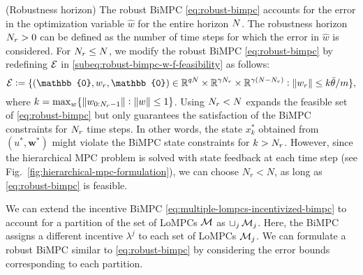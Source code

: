 \begin{remark} (Robustness horizon)
\label{rem:robustness-horizon}
The robust BiMPC \eqref{eq:robust-bimpc} accounts for the error in the optimization variable $\hat{w}$ for the entire horizon $N$.
The robustness horizon $N_r > 0$ can be defined as the number of time steps for which the error in $\hat{w}$ is considered.
For $N_r \leq N$, we modify the robust BiMPC \eqref{eq:robust-bimpc} by redefining $\mathcal{E}$ in \eqref{subeq:robust-bimpc-w-f-feasibility} as follows:
\begin{equation*}
    \mathset{E} := \{(\mathbb{0}, w_r, \mathbb{0}) \in \real^{\Nu\horizon} \times \real^{\Nw\horizon_r} \times \real^{\Nw(\horizon-\horizon_r)}: \lVert w_r \rVert \leq k \bar{\theta}/\constsc\},
\end{equation*}
where $k = \max_w \{\lVert w_{0:N_r-1} \rVert: \lVert w\rVert \leq 1\}$.
Using $N_r < N$ expands the feasible set of \eqref{eq:robust-bimpc} but only guarantees the satisfaction of the BiMPC constraints for $N_r$ time steps.
In other words, the state $x^*_k$ obtained from $(u^*, \bm{w}^*)$ might violate the BiMPC state constraints for $k > N_r$.
However, since the hierarchical MPC problem is solved with state feedback at each time step (see Fig.~\ref{fig:hierarchical-mpc-formulation}), we can choose $N_r < N$, as long as \eqref{eq:robust-bimpc} is feasible.
\end{remark}

\begin{remark}
\label{rem:partition-of-lompcs}
    We can extend the incentive BiMPC \eqref{eq:multiple-lompcs-incentivized-bimpc} to account for a partition of the set of LoMPCs $\mathcal{M}$ as $\sqcup_j \, \mathcal{M}_j$.
    Here, the BiMPC assigns a different incentive $\lambda^j$ to each set of LoMPCs $\mathcal{M}_j$.
    We can formulate a robust BiMPC similar to \eqref{eq:robust-bimpc} by considering the error bounds corresponding to each partition.
\end{remark}

